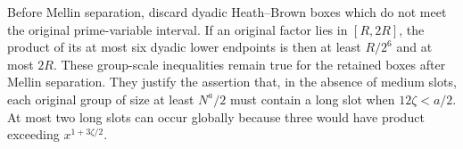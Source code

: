 Before Mellin separation, discard dyadic Heath--Brown boxes
which do not meet the original prime-variable interval.
If an original factor lies in $[R,2R]$, the product of its
at most six dyadic lower endpoints is then at least
$R/2^6$ and at most $2R$.
These group-scale inequalities remain true for the retained
boxes after Mellin separation.
They justify the assertion that, in the absence of medium
slots, each original group of size at least $N^a/2$
must contain a long slot when $12\zeta<a/2$.
At most two long slots can occur globally because three
would have product exceeding $x^{1+3\zeta/2}$.
